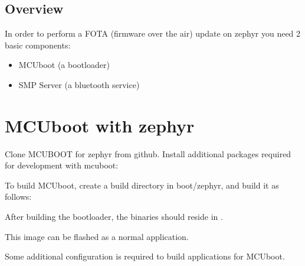 \documentclass[letterpaper,10pt,english]{sphinxmanual}
\begin{document}
\subsection{Overview}
\label{\detokenize{fota/mcuboot:overview}}
In order to perform a FOTA (firmware over the air) update on zephyr you need 2 basic components:
\begin{itemize}
\item {} 
MCUboot   (a bootloader)

\item {} 
SMP Server (a bluetooth service)

\end{itemize}


\section{MCUboot with zephyr}
\label{\detokenize{fota/mcuboot:mcuboot-with-zephyr}}\label{\detokenize{fota/mcuboot:id1}}
Clone MCUBOOT for zephyr from github.
Install additional packages required for development with mcuboot:

\begin{sphinxVerbatim}[commandchars=\\\{\}]
   
    
\end{sphinxVerbatim}

To build MCUboot, create a build directory in boot/zephyr, and build
it as follows:

\begin{sphinxVerbatim}[commandchars=\\\{\}]
 
    
   
\end{sphinxVerbatim}

After building the bootloader, the binaries should reside in
.

This image can be flashed as a normal application.

Some additional configuration is required to build applications for MCUboot.
\end{document}
